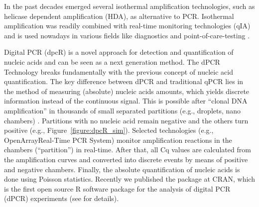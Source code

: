 In the past decades 
emerged several isothermal amplification technologies, such as helicase 
dependent amplification (HDA), as alternative to PCR. Isothermal amplification 
was readily combined with real-time monitoring technologies (qIA) and is used 
nowadays in various fields like diagnostics and point-of-care-testing 
\citep{rodiger_nucleic_2014}.

Digital PCR (dpcR) is a novel approach for detection and quantification of 
nucleic acids and can be seen as a next generation method. The dPCR Technology 
breaks fundamentally with the previous concept of nucleic acid quantification. 
The key difference between dPCR and traditional qPCR lies in the method of 
measuring (absolute) nucleic acids amounts, which yields discrete information 
instead of the continuous signal. This is possible after ``clonal DNA 
amplification'' in thousands of small separated partitions (e.g., droplets, nano 
chambers) \citep{huggett_2013, milbury_2014, morley_2014}. Partitions with no 
nucleic acid remain negative and the others turn positive (e.g., 
Figure~\ref{figure:dpcR_sim}). Selected technologies (e.g., 
OpenArray\textregistered Real-Time PCR System) monitor amplification reactions 
in the chambers (``partition'') in real-time. After that, all Cq values are 
calculated from the amplification curves and converted into discrete events by 
means of positive and negative chambers. Finally, the absolute quantification of 
nucleic acids is done using Poisson statistics. Recently we published the 
 package at CRAN, which is the first 
open source R software package for the analysis of digital PCR (dPCR) 
experiments (see  for details).


